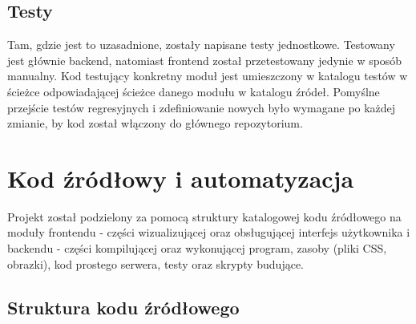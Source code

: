 \documentclass[a4paper,twoside,openright,11pt]{report}
\begin{document}
  \section{Testy}
\par Tam, gdzie jest to uzasadnione, zostały napisane testy jednostkowe. Testowany jest głównie backend, natomiast frontend został przetestowany jedynie w sposób manualny.  Kod testujący konkretny moduł jest umieszczony w katalogu testów w ścieżce odpowiadającej ścieżce danego modułu w katalogu źródeł. Pomyślne przejście testów regresyjnych i zdefiniowanie nowych było wymagane po każdej zmianie, by kod został włączony do głównego repozytorium.

  \chapter {Kod źródłowy i automatyzacja}
\par Projekt został podzielony za pomocą struktury katalogowej kodu źródłowego na moduły frontendu - części wizualizującej oraz obsługującej interfejs użytkownika i backendu - części kompilującej oraz wykonującej program, zasoby (pliki CSS, obrazki), kod prostego serwera, testy oraz skrypty budujące. 

  \section{Struktura kodu źródłowego}
\end{document}
